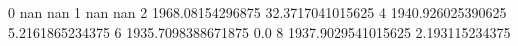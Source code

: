 0 nan nan
1 nan nan
2 1968.08154296875 32.3717041015625
4 1940.926025390625 5.2161865234375
6 1935.7098388671875 0.0
8 1937.9029541015625 2.193115234375
